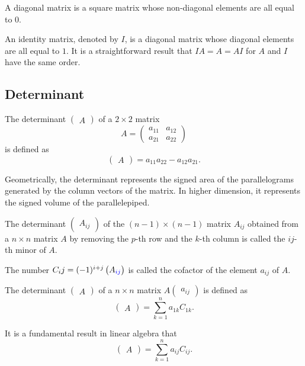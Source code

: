 A diagonal matrix is a square matrix whose non-diagonal elements are all equal to $0$.

An identity matrix, denoted by $I$, is a diagonal matrix whose diagonal elements are all equal to $1$. It is a straightforward result that $IA=A=AI$ for $A$ and $I$ have the same order.

\subsection*{Determinant}

The determinant $\begin{pmatrix}
  A
\end{pmatrix}$ of a $2\times 2$ matrix
\[A=\begin{pmatrix}
  a_{11} & a_{12}\\
  a_{21} & a_{22}
\end{pmatrix}\]
is defined as
\[\begin{pmatrix}
  A
\end{pmatrix}=a_{11}a_{22}-a_{12}a_{21}.\]

Geometrically, the determinant represents the signed area of the parallelograms generated by the column vectors of the matrix. In higher dimension, it represents the signed volume of the parallelepiped.

The determinant $\begin{pmatrix} A_{ij} \end{pmatrix}$ of the $(n-1)\times (n-1)$ matrix $A_{ij}$ obtained from a $n\times n$ matrix $A$ by removing the $p$-th row and the $k$-th column is called the $ij$-th minor of $A$.

The number $C_ij=(-1)^{i+j}\begin{pmatrix}A_{\color{blue}{ij}}\end{pmatrix}$ is called the cofactor of the element $a_{ij}$ of $A$.

The determinant $\begin{pmatrix}
  A
\end{pmatrix}$ of a $n\times n$ matrix $A\begin{pmatrix}
  a_{ij}
\end{pmatrix}$ is defined as
\[\begin{pmatrix}
  A
\end{pmatrix}=\sum\limits_{k=1}^n a_{1k}C_{1k}.\]

It is a fundamental result in linear algebra that 
\[\begin{pmatrix}
  A
\end{pmatrix}=\sum\limits_{k=1}^n a_{ij}C_{ij}.\]

